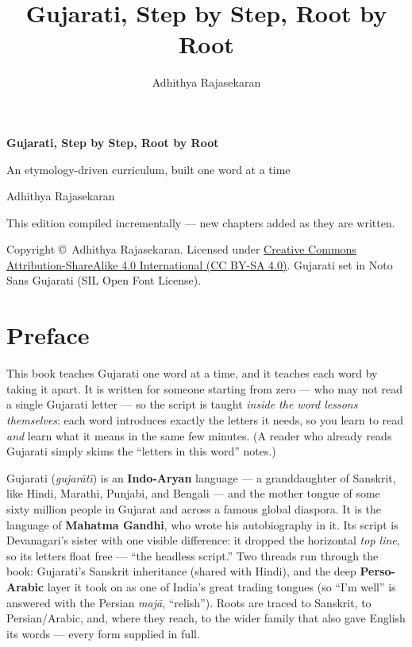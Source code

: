 \documentclass[11pt,twoside]{book}
\title{\Huge Gujarati, Step by Step, Root by Root}
\author{Adhithya Rajasekaran}
\date{}
\begin{document}
\frontmatter

\begin{titlepage}
  \centering
  \vspace*{3cm}
  {\Huge\bfseries Gujarati, Step by Step, Root by Root\par}
  \vspace{1cm}
  {\Large An etymology-driven curriculum, built one word at a time\par}
  \vspace{1.5cm}
  {\large Adhithya Rajasekaran\par}
  \vfill
  {\large This edition compiled incrementally --- new chapters added as they
  are written.\par}
  \vspace{2cm}
  {\normalsize
    Copyright \copyright\ Adhithya Rajasekaran. Licensed under
    \href{https://creativecommons.org/licenses/by-sa/4.0/}%
    {Creative Commons Attribution-ShareAlike 4.0 International (CC BY-SA 4.0)}.
    Gujarati set in Noto Sans Gujarati (SIL Open Font License).\par
  }
\end{titlepage}

\chapter*{Preface}

This book teaches Gujarati one word at a time, and it teaches each word by taking
it apart. It is written for someone starting from zero --- who may not read a
single Gujarati letter --- so the script is taught
\emph{inside the word lessons themselves}: each word introduces exactly the
letters it needs, so you learn to read  \emph{and} learn what it means
in the same few minutes. (A reader who already reads Gujarati simply skims the
``letters in this word'' notes.)

Gujarati (\emph{gujar\=at\=\i}) is an \textbf{Indo-Aryan} language --- a
granddaughter of Sanskrit, like Hindi, Marathi, Punjabi, and Bengali --- and the
mother tongue of some sixty million people in Gujarat and across a famous global
diaspora. It is the language of \textbf{Mahatma Gandhi}, who wrote his
autobiography in it. Its script is Devanagari's sister with one visible
difference: it dropped the horizontal \emph{top line}, so its letters float free
--- ``the headless script.'' Two threads run through the book: Gujarati's Sanskrit
inheritance (shared with Hindi), and the deep \textbf{Perso-Arabic} layer it took
on as one of India's great trading tongues (so ``I'm well'' is answered with the
Persian \emph{maj\=a}, ``relish''). Roots are traced to Sanskrit, to
Persian/Arabic, and, where they reach, to the wider family that also gave English
its words --- every form supplied in full.
\end{document}
